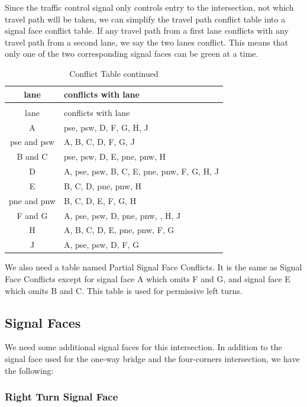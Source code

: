 \documentclass[letterpaper,twoside]{article}
\begin{document}
Since the traffic control signal only controls entry to the
intersection, not which travel path will be taken,
we can simplify the travel path conflict table into a signal face
conflict table.  If any travel path from a first lane conflicts with
any travel path from a second lane, we say the two lanes conflict.
This means that only one of the two corresponding signal faces
can be green at a time.

\begin{longtable}{c | l}
  \caption{Conflict Table} \\
  lane & conflicts with lane \\
  \hline \endfirsthead
  \caption{Conflict Table continued} \\
  lane & conflicts with lane \\
  \hline \endhead
  A & pse, psw, D, F, G, H, J \\
  pse and psw & A, B, C, D, F, G, J \\
  B and C & pse, psw, D, E, pne, pnw, H \\
  D & A, pse, psw, B, C, E, pne, pnw, F, G, H, J \\
  E & B, C, D, pne, pnw, H \\
  pne and pnw & B, C, D, E, F, G, H \\
  F and G & A, pse, psw, D, pne, pnw, , H, J \\
  H & A, B, C, D, E, pne, pnw, F, G \\
  J & A, pse, psw, D, F, G \\
\end{longtable}

We also need a table named Partial Signal Face Conflicts.  It is the same
as Signal Face Conflicts except for signal face A which omits F and G,
and signal face E which omits B and C.  This table is used for permissive
left turns.

\subsection{Signal Faces}

We need some additional signal faces for this intersection.  In addition
to the signal face used for the one-way bridge and the four-corners
intersection, we have the following:

\subsubsection{Right Turn Signal Face}
\end{document}
